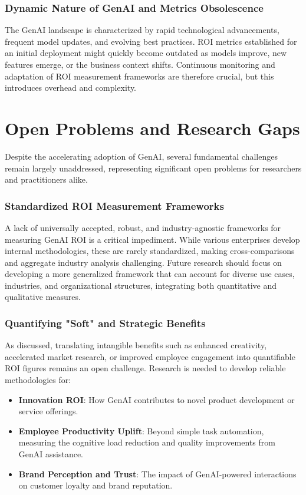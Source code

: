 \documentclass[10pt,journal,compsoc,twocolumn]{IEEEtran}
\begin{document}
\subsubsection{Dynamic Nature of GenAI and Metrics Obsolescence}

The GenAI landscape is characterized by rapid technological advancements, frequent model updates, and evolving best practices. ROI metrics established for an initial deployment might quickly become outdated as models improve, new features emerge, or the business context shifts. Continuous monitoring and adaptation of ROI measurement frameworks are therefore crucial, but this introduces overhead and complexity.


\section{Open Problems and Research Gaps}


Despite the accelerating adoption of GenAI, several fundamental challenges remain largely unaddressed, representing significant open problems for researchers and practitioners alike.


\subsubsection{Standardized ROI Measurement Frameworks}

A lack of universally accepted, robust, and industry-agnostic frameworks for measuring GenAI ROI is a critical impediment. While various enterprises develop internal methodologies, these are rarely standardized, making cross-comparisons and aggregate industry analysis challenging. Future research should focus on developing a more generalized framework that can account for diverse use cases, industries, and organizational structures, integrating both quantitative and qualitative measures.


\subsubsection{Quantifying "Soft" and Strategic Benefits}

As discussed, translating intangible benefits such as enhanced creativity, accelerated market research, or improved employee engagement into quantifiable ROI figures remains an open challenge. Research is needed to develop reliable methodologies for:
\begin{itemize}
  \item \textbf{Innovation ROI}: How GenAI contributes to novel product development or service offerings.
  \item \textbf{Employee Productivity Uplift}: Beyond simple task automation, measuring the cognitive load reduction and quality improvements from GenAI assistance.
  \item \textbf{Brand Perception and Trust}: The impact of GenAI-powered interactions on customer loyalty and brand reputation.
\end{itemize}
\end{document}

